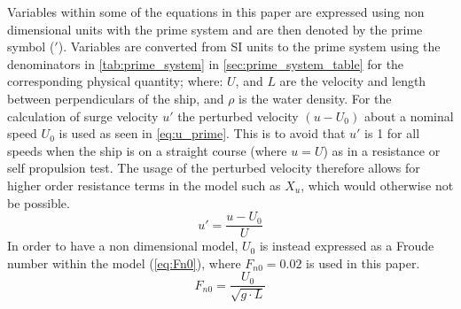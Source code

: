 Variables within some of the equations in this paper are expressed using non dimensional units with the prime system and are then denoted by the prime symbol ($'$). Variables are converted from SI units to the prime system using the denominators in \autoref{tab:prime_system} in \autoref{sec:prime_system_table} for the corresponding physical quantity; where: $U$, and $L$ are the velocity and length between perpendiculars of the ship, and $\rho$ is the water density.
For the calculation of surge velocity $u'$ the perturbed velocity $(u-U_0)$ about a nominal speed $U_0$ is used as seen in \autoref{eq:u_prime}. This is to avoid that $u'$ is 1 for all speeds when the ship is on a straight course (where $u=U$) as in a resistance or self propulsion test. The usage of the perturbed velocity therefore allows for higher order resistance terms in the model such as $X_{u}$, which would otherwise not be possible. 
\begin{equation}
    \label{eq:u_prime}
    u' = \frac{u-U_0}{U}
\end{equation}
In order to have a non dimensional model, $U_0$ is instead expressed as a Froude number within the model (\autoref{eq:Fn0}), where $F_{n0}=0.02$ is used in this paper.
\begin{equation}
    \label{eq:Fn0}
    F_{n0} = \frac{U_0}{\sqrt{g \cdot L}}
\end{equation}